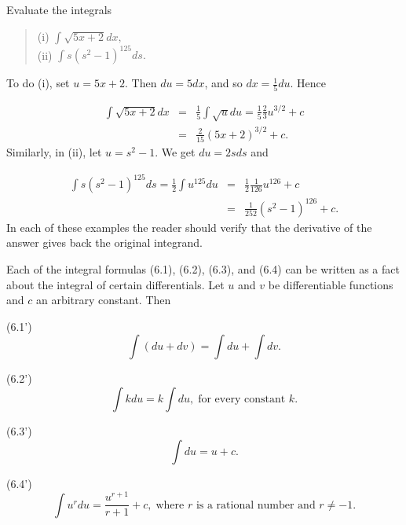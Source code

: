 \begin{example}
Evaluate the integrals

\begin{quote}
\begin{description}
\item[(i)  $\int \sqrt{5x + 2} dx,$]
\item[(ii) $\int s(s^2 - 1)^{125} ds.$]

\end{description}
\end{quote}
\noindent To do (i), set $u = 5x + 2$. Then $du = 5 dx$, and so $dx = \frac{1}{5} du$. Hence

\begin{eqnarray*}
\int \sqrt{5x + 2} dx 
&=& \frac{1}{5} \int \sqrt{u} du = \frac{1}{5}\frac{2}{3} u^{3/2} + c \\
&=& \frac{2}{15}(5x + 2)^{3/2} + c.
\end{eqnarray*}
\noindent Similarly, in (ii), let $u = s^2 - 1$. We get $du = 2s ds$ and

\begin{eqnarray*}
\int s(s^2 - 1)^{125} ds = \frac{1}{2} \int u^{125} du 
&=& \frac{1}{2} \frac{1}{126} u^{126} + c  \\
&=& \frac{1}{252} (s^2 - 1)^{126} + c.
\end{eqnarray*}
\noindent In each of these examples the reader should verify that the derivative of the answer gives back the original integrand.
\end{example}
\medskip

Each of the integral formulas (6.1), (6.2), (6.3), and (6.4) can be written as a fact about the integral of certain differentials. Let $u$ and $v$ be
differentiable functions and $c$ an arbitrary constant. Then

\begin{theorem} (6.1')
$$\int (du + dv) = \int du + \int dv.$$
\end{theorem}

\begin{theorem} (6.2')
$$
\int k du = k \int du,\; \mbox{for every constant $k$}.
$$
\end{theorem}

\begin{theorem} (6.3')
$$\int du = u + c.$$
\end{theorem}

\begin{theorem} (6.4') 
$$\int u^r du = \frac{u ^{r + 1}}{r + 1} + c, \;\mbox{where $r$ is a rational number and $r \neq -1$}.$$
\end{theorem}
